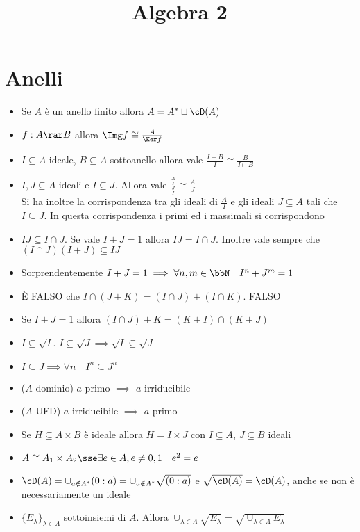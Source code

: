 \documentclass[a4paper,NoNotes,GeneralMath]{stdmdoc}
\begin{document}
	\title{Algebra 2}
	
	\section*{Anelli}
	\begin{itemize}
		\item Se $A$ è un anello finito allora $A = A^* \sqcup \cD(A)$
		\item $f: A \rar B$ allora $\Img f \cong \frac{A}{\Ker f}$
		\item $I \subseteq A$ ideale, $B \subseteq A$ sottoanello allora vale $\frac{I+B}{I} \cong \frac{B}{I\cap B}$
		\item $I, J \subseteq A$ ideali e $I \subseteq J$. Allora vale $\frac{\frac{A}{I}}{\frac{J}{I}} \cong \frac{A}{J}$ \\
			Si ha inoltre la corrispondenza tra gli ideali di $\frac{A}{I}$ e gli ideali $J \subseteq A$ tali che $I \subseteq J$. In questa corrispondenza i primi ed i massimali si corrispondono
		\item $IJ \subseteq I \cap J$. Se vale $I + J = 1$ allora $IJ = I \cap J$. Inoltre vale sempre che $(I \cap J)(I + J) \subseteq IJ$
		\item Sorprendentemente $I + J = 1 \implies \forall n, m \in \bbN \quad I^n + J^m = 1$
		\item È FALSO che $I \cap (J + K) = (I \cap J) + (I \cap K)$. FALSO
		\item Se $I + J = 1$ allora $(I \cap J) + K = (K + I) \cap (K + J)$
		\item $I \subseteq \sqrt{I}$. $I \subseteq \sqrt{J} \implies \sqrt{I} \subseteq \sqrt{J}$
		\item $I \subseteq J \implies \forall n \quad I^n \subseteq J^n$
		\item ($A$ dominio) $a$ primo $\implies$ $a$ irriducibile
		\item ($A$ UFD) $a$ irriducibile $\implies$ $a$ primo
		\item Se $H \subseteq A \times B$ è ideale allora $H = I \times J$ con $I \subseteq A$, $J \subseteq B$ ideali
		\item $A \cong A_1 \times A_2 \sse \exists e \in A, e \neq 0,1 \quad e^2 = e$
		\item $\cD(A) = \cup_{a \notin A^*} (0 : a) = \cup_{a \notin A^*} \sqrt{(0 : a)}$ e $\sqrt{\cD(A)} = \cD(A)$, anche se non è necessariamente un ideale
		\item $\{ E_\lambda \}_{\lambda \in \Lambda}$ sottoinsiemi di $A$. Allora $\cup_{\lambda \in \Lambda} \sqrt{E_\lambda} = \sqrt{\cup_{\lambda \in \Lambda} E_\lambda}$

\end{itemize}
\end{document}
